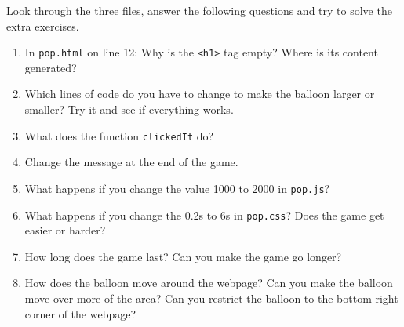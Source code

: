 \documentclass[11pt,a4paper]{report}
\begin{document}
\begin{ex} Look through the three files, answer the following questions and try to solve the extra exercises.
\begin{enumerate}
\item In \verb|pop.html| on line 12: Why is the \verb|<h1>| tag empty? Where is its content generated?
\item Which lines of code do you have to change to make the balloon larger or smaller? Try it and see if everything works.
\item What does the function \verb|clickedIt| do?
\item Change the message at the end of the game.
\item What happens if you change the value 1000 to 2000 in \verb|pop.js|?
\item What happens if you change the 0.2s to 6s in \verb|pop.css|? Does the game get easier or harder?
\item How long does the game last? Can you make the game go longer?
\item How does the balloon move around the webpage? Can you make the balloon move over more of the area? Can you restrict the balloon to the bottom right corner of the webpage?
\end{enumerate}
\end{ex}
\end{document}
